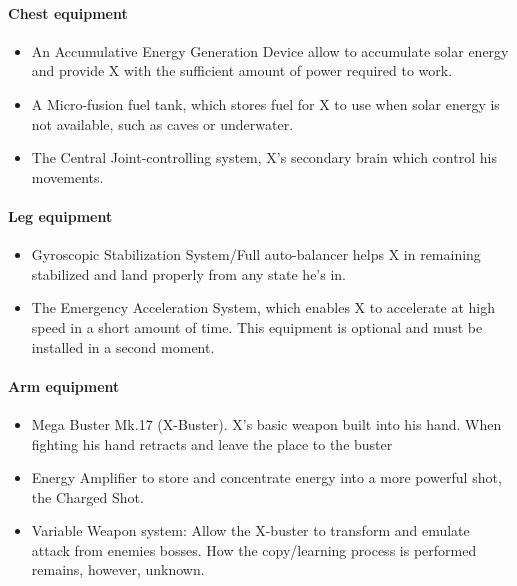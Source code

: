 \paragraph{Chest equipment}
\begin{itemize}
	\item An Accumulative Energy Generation Device allow to accumulate solar energy and provide X with the sufficient amount of power required to work.
	\item A Micro-fusion fuel tank, which stores fuel for X to use when solar energy is not available, such as caves or underwater.
	\item The Central Joint-controlling system, X's secondary brain which control his movements.
\end{itemize}

\paragraph{Leg equipment}
\begin{itemize}
	\item Gyroscopic Stabilization System/Full auto-balancer helps X in remaining stabilized and land properly from any state he's in.
	\item The Emergency Acceleration System, which enables X to accelerate at high speed in a short amount of time. This equipment is optional and must be installed in a second moment.
\end{itemize}

\paragraph{Arm equipment}
\begin{itemize}
	\item Mega Buster Mk.17 (X-Buster). X’s basic weapon built into his hand. When fighting his hand retracts and leave the place to the buster~\cite{elysium_weapons}
	\item Energy Amplifier to store and concentrate energy into a more powerful shot, the Charged Shot.
	\item Variable Weapon system: Allow the X-buster to transform and emulate attack from enemies bosses. How the copy/learning process is performed remains, however, unknown.
\end{itemize}


